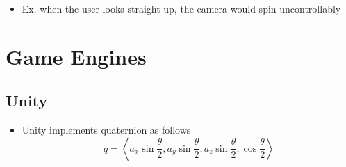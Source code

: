   \begin{itemize}
    \item Ex. when the user looks straight up, the camera would spin
    uncontrollably
  \end{itemize}


\section{Game Engines}

  \subsection{Unity}

    \begin{itemize}
      \item Unity implements quaternion as follows
      \begin{equation}
        q =
        \left<
          a_{x} \sin\frac{\theta}{2},
          a_{y} \sin\frac{\theta}{2},
          a_{z} \sin\frac{\theta}{2},
          \cos\frac{\theta}{2}
        \right>
      \end{equation}
    \end{itemize}
